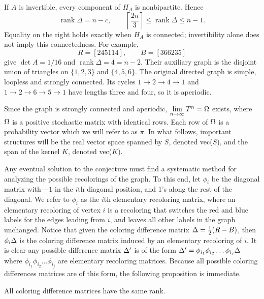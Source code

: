 \begin{remark}
\label{delta-rank:invertible}
If $A$ is invertible, every component of $H_A$ is nonbipartite. Hence
\[
 \operatorname{rank}\Delta=n-c,\qquad
 \left\lceil\frac{2n}{3}\right\rceil
 \le\operatorname{rank}\Delta\le n-1.
\]
Equality on the right holds exactly when $H_A$ is connected; invertibility
alone does not imply this connectedness. For example,
\[
 R=[245114],\qquad B=[366235]
\]
give $\det A=1/16$ and $\operatorname{rank}\Delta=4=n-2$.
Their auxiliary graph is the disjoint union of triangles on $\{1,2,3\}$
and $\{4,5,6\}$. The original directed graph is simple, loopless and
strongly connected. Its cycles $1\to2\to4\to1$ and
$1\to2\to6\to5\to1$ have lengths three and four, so it is aperiodic.
\end{remark}

  
Since the graph is strongly connected and aperiodic, $\lim\limits_{n\to\infty} T^n= \Omega$ exists, where $\Omega$ is a positive stochastic matrix with identical rows.  
Each row of $\Omega$ is a probability vector which we will refer to as $\pi$.  
In what follows, important structures will be the real vector space spanned by $S$, denoted vec($S$), and the span of the kernel $K$, denoted vec($K$).


Any eventual solution to the conjecture must find a systematic method for analyzing the possible recolorings of the graph.  
To this end, let $\phi_i$ be the diagonal matrix with $-1$ in the $i$th diagonal position, and 1’s along the rest of the diagonal.   
We refer to $\phi_i$ as the $i$th elementary recoloring matrix, where an elementary recoloring of vertex $i$ is a recoloring that switches the red and blue labels for the edges leading from $i$, and leaves all other labels in the graph unchanged.  
Notice that given the coloring difference matrix $\Delta = \frac{1}{2}(R-B)$, then $\phi_i\Delta$ is the coloring difference matrix induced by an elementary recoloring of $i$.  
It is clear any possible difference matrix $\Delta'$ is of the form $\Delta'=\phi_{i_1} \phi_{i_2} \ldots \phi_{i_j}\Delta$ where $\phi_{i_1} \phi_{i_2} \ldots \phi_{i_j}$ are elementary recoloring matrices.  
Because all possible coloring differences matrices are of this form, the following proposition is immediate.


\begin{proposition}  \label{prop:5.1}
All coloring difference matrices have the same rank.
\end{proposition}
